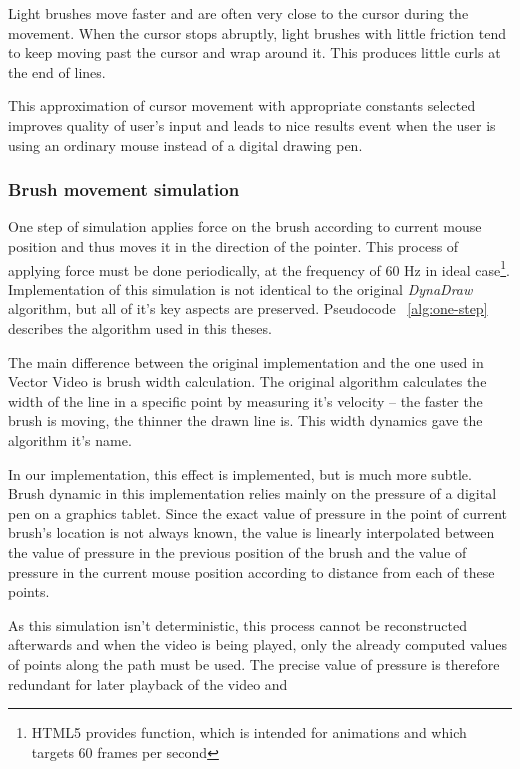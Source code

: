 Light brushes move faster and are often very close to the cursor during the movement. When the cursor stops abruptly, light brushes with little friction tend to keep moving past the cursor and wrap around it. This produces little curls at the end of lines.

This approximation of cursor movement with appropriate constants selected improves quality of user's input and leads to nice results event when the user is using an ordinary mouse instead of a digital drawing pen.

\subsubsection*{Brush movement simulation}

One step of simulation applies force on the brush according to current mouse position and thus moves it in the direction of the pointer. This process of applying force must be  done periodically, at the frequency of 60 Hz in ideal case\footnote{HTML5 provides  function, which is intended for animations and which targets 60 frames per second}. Implementation of this simulation is not identical to the original \textit{DynaDraw} algorithm, but all of it's key aspects are preserved. Pseudocode ~\ref{alg:one-step} describes the algorithm used in this theses.

The main difference between the original implementation and the one used in Vector Video is brush width calculation. The original algorithm calculates the width of the line in a specific point by measuring it's velocity -- the faster the brush is moving, the thinner the drawn line is. This width dynamics gave the algorithm it's name.

In our implementation, this effect is implemented, but is much more subtle. Brush dynamic in this implementation relies mainly on the pressure of a digital pen on a graphics tablet. Since the exact value of pressure in the point of current brush's location is not always known, the value is linearly interpolated between the value of pressure in the previous position of the brush and the value of pressure in the current mouse position according to distance from each of these points.

As this simulation isn't deterministic, this process cannot be reconstructed afterwards and when the video is being played, only the already computed values of points along the path must be used. The precise value of pressure is therefore redundant for later playback of the video and 

